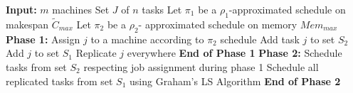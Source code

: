 \documentclass[twocolumn]{svjour3}
\begin{document}
\begin{algorithm}
  \caption{$ABO_\triangle$}
  \label{alg1}
  \begin{algorithmic} 
    \State \textbf{Input:} $m$ machines 
    \State \hspace*{42pt}Set $J$ of $n$ tasks
    \State\hspace*{42pt}Let $\pi_1$ be a $ \rho_1$-approximated schedule on makespan $\tilde{C}_{max}$ 
    \State \hspace*{42pt}Let $\pi_2$ be a $\rho_2$- approximated schedule on memory ${Mem_{max}}$
    \State
    \State \textbf{Phase 1:}
    \State Assign $j$ to a machine according to $\pi_2$ schedule
    \State Add task $j$ to set $S_2$   
    \EndIf 
    \EndFor
    \State Add $j$ to set $S_1$
    \State Replicate $j$ everywhere   
    \EndIf 
    \EndFor
    \State \textbf{End of Phase 1} 
    \State 
    \State \textbf{Phase 2:} 
    \State \hspace*{42pt}Schedule tasks from set $S_2$ respecting job assignment during phase 1
    \State \hspace*{42pt} Schedule all replicated tasks from set $S_1$ using Graham's LS Algorithm 
    \State \textbf{End of Phase 2} 
    
  \end{algorithmic}
\end{algorithm}
\end{document}
